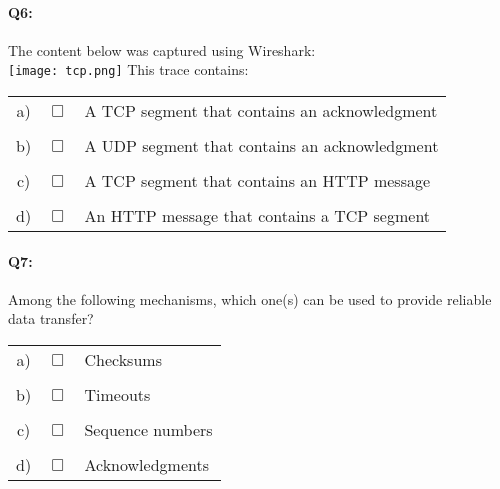 \documentclass{llncs}
\newcommand{\answer}[1]{}%
\begin{document}
\answer{See answer to the previous question.}

\paragraph{\textbf{Q6:}}
The content below was captured using
Wireshark:\\
\texttt{[image: tcp.png]}
This trace contains:\\

\begin{tabular}{ccl}
  a) & $\Box$ & A TCP segment that contains an acknowledgment  \\
  \\
  b) & $\Box$ & A UDP segment that contains an acknowledgment \\
  \\
  c) & $\Box$ & A TCP segment that contains an HTTP message \\
  \\
  d) & $\Box$ & An HTTP message that contains a TCP segment \\
\end{tabular}

\answer{The trace shows a TCP segment (see blue highlight). The
  segment contains an acknowledgment, as shown by the flags. b) The
  trace doesn't show any UDP segment (and it couldn't, as a packet
  couldn't use both UDP and TCP). c) Although a TCP segment might
  contain an HTTP message, it is not the case here: the length of the
  segment is 0, which means that the segment doesn't contain any data
  (it's just an ACK). d) An HTTP message may not contain a TCP segment
  since HTTP is an application-level protocol and TCP is transport-level.}

\paragraph{\textbf{Q7:}}
Among the following mechanisms, which one(s) can be used to provide reliable data transfer? 

\begin{tabular}{ccl}
  a) & $\Box$ & Checksums  \\
  \\
  b) & $\Box$ &  Timeouts\\
  \\
  c) & $\Box$ &  Sequence numbers\\
  \\
  d) & $\Box$ &  Acknowledgments\\
\end{tabular}
\end{document}
